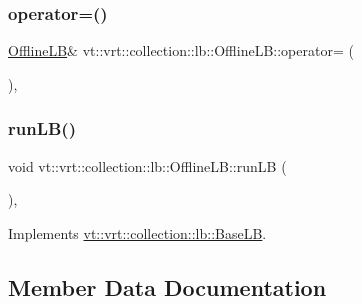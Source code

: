 \subsubsection{\texorpdfstring{operator=()}{operator=()}\hspace{0.1cm}{\footnotesize\ttfamily [2/2]}}
{\footnotesize\ttfamily \hyperlink{structvt_1_1vrt_1_1collection_1_1lb_1_1_offline_l_b}{Offline\+LB}\& vt\+::vrt\+::collection\+::lb\+::\+Offline\+L\+B\+::operator= (\begin{DoxyParamCaption}\item[{\hyperlink{structvt_1_1vrt_1_1collection_1_1lb_1_1_offline_l_b}{Offline\+LB} \&\&}]{ }\end{DoxyParamCaption})\hspace{0.3cm}{\ttfamily [default]}, {\ttfamily [noexcept]}}

\mbox{\label{structvt_1_1vrt_1_1collection_1_1lb_1_1_offline_l_b_ad6b473ed506c50b86e308fc9840a11d7}} 
\subsubsection{\texorpdfstring{run\+L\+B()}{runLB()}}
{\footnotesize\ttfamily void vt\+::vrt\+::collection\+::lb\+::\+Offline\+L\+B\+::run\+LB (\begin{DoxyParamCaption}\item[{\hyperlink{namespacevt_a8fb51741340b87d7aaee0bef60e9896b}{Load\+Type}}]{ }\end{DoxyParamCaption})\hspace{0.3cm}{\ttfamily [override]}, {\ttfamily [virtual]}}



Implements \hyperlink{structvt_1_1vrt_1_1collection_1_1lb_1_1_base_l_b_aa957038bb132ac29fb61535487f0604f}{vt\+::vrt\+::collection\+::lb\+::\+Base\+LB}.



\subsection{Member Data Documentation}
\mbox{\label{structvt_1_1vrt_1_1collection_1_1lb_1_1_offline_l_b_a38da27cd9b5a0e0e6582f06c07e1f3d5}} 
